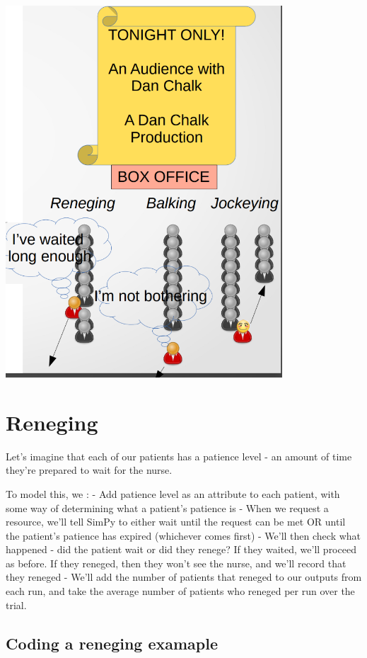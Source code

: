 \documentclass[
  letterpaper,
  DIV=11,
  numbers=noendperiod]{scrreprt}
\begin{document}
\includegraphics{images/reneging_balking_jockeying_overview.png}

\section{Reneging}\label{reneging}

Let's imagine that each of our patients has a patience level - an amount
of time they're prepared to wait for the nurse.

To model this, we : - Add patience level as an attribute to each
patient, with some way of determining what a patient's patience is -
When we request a resource, we'll tell SimPy to either wait until the
request can be met OR until the patient's patience has expired
(whichever comes first) - We'll then check what happened - did the
patient wait or did they renege? If they waited, we'll proceed as
before. If they reneged, then they won't see the nurse, and we'll record
that they reneged - We'll add the number of patients that reneged to our
outputs from each run, and take the average number of patients who
reneged per run over the trial.

\subsection{Coding a reneging
examaple}\label{coding-a-reneging-examaple}
\end{document}
